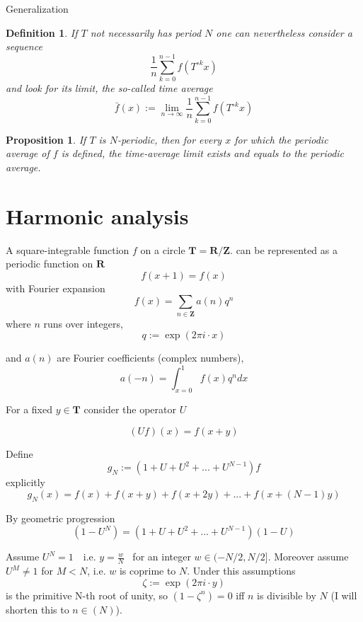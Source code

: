 \documentclass[12pt]{article}
\numberwithin{equation}{section}
\newtheorem{definition}[dummy]{Definition}   %
\newtheorem{proposition}[dummy]{Proposition} %
\newcommand\R{\mathbf{R}}                    %
\newcommand\T{\mathbf{T}}                    %
\newcommand\Z{\mathbf{Z}}                    %
\begin{document}
Generalization
\begin{definition}
If $T$ not necessarily has period $N$ one can nevertheless consider a sequence
\[ \frac{1}{n} \sum_{k=0}^{n-1} f(T^{\circ k} x) \]
and look for its limit, the so-called time average
\[ \bar{f}(x) := \lim_{n\to\infty} \frac{1}{n} \sum_{k=0}^{n-1} f(T^{\circ k} x) \]
\end{definition}

\begin{proposition}
If $T$ is $N$-periodic, 
then for every $x$ for which the periodic average of $f$ is defined,
the time-average limit exists and equals to the periodic average.
\end{proposition}

\section{Harmonic analysis}
\label{sec:harmonic}

A square-integrable function $f$ on a circle $\T = \R/\Z$.
can be represented as a periodic function on $\R$ 
\[ f(x+1)=f(x) \]
with Fourier expansion
\[ f(x) = \sum_{n\in\Z}   a(n)   q^n \]
where $n$ runs over integers,
\[ q := \exp(2πi\cdot x) \]

and $a(n)$ are Fourier coefficients (complex numbers), 
\[ a(-n) = \int_{x=0}^1 f(x) q^n dx \]

For a fixed $y\in \T$
consider the operator $U$

\[ (Uf) (x) = f(x+y) \]

Define
\[ g_N := (1+U+U^2+...+U^{N-1}) f \]
explicitly
\[ g_N(x) = f(x) + f(x+y) + f(x+2y) + ... + f(x + (N-1)y) \]

By geometric progression
\[ (1-U^N)=  (1+U+U^2+...+U^{N-1}) (1-U) \]

Assume $U^N=1$  i.e. $y=\frac{w}{N}$  for an integer $w \in (-N/2,N/2]$.
Moreover assume $U^M \neq 1$ for $M<N$, i.e. $w$ is coprime to $N$.
Under this assumptions
\[  ζ := \exp(2πi\cdot y) \]
is the primitive N-th root of unity, 
so $(1-ζ^n) = 0$ iff $n$ is divisible by $N$ (I will shorten this to $n\in(N)$).
\end{document}
